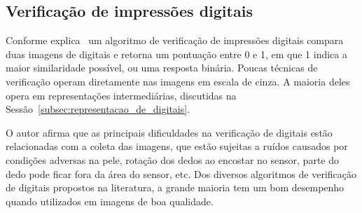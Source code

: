 \subsection{Verificação de impressões digitais}\label{subsubsec:verificacao_digitais}

Conforme explica~ um algoritmo de verificação de impressões digitais compara duas imagens de digitais e retorna um pontuação entre 0 e 1, em que 1 indica a maior similaridade possível, ou uma resposta binária. Poucas técnicas de verificação operam diretamente nas imagens em escala de cinza. A maioria deles opera em representações intermediárias, discutidas na Sessão~\ref{subsec:representacao_de_digitais}.

O autor afirma que as principais dificuldades na verificação de digitais estão relacionadas com a coleta das imagens, que estão sujeitas a ruídos causados por condições adversas na pele, rotação dos dedos ao encostar no sensor, parte do dedo pode ficar fora da área do sensor, etc. Dos diversos algoritmos de verificação de digitais propostos na literatura, a grande maioria tem um bom desempenho quando utilizados em imagens de boa qualidade.





